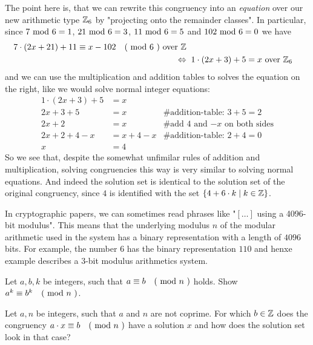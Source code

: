 \begin{example} 
The point here is, that we can rewrite this congruency into an \textit{equation} over our new arithmetic type $\mathbb{Z}_6$ by "projecting onto the remainder classes". In particular, since $7 \text{ mod } 6= 1$, $21 \text{ mod } 6= 3$, $11 \text{ mod } 6= 5$ and $102 \text{ mod } 6= 0$ we have
\begin{align*}
7\cdot(2x+21) + 11 \equiv x-102 \quad \text{( mod } 6 \text{ )} \text{ over } \mathbb{Z}\\ 
\Leftrightarrow & \; \; 1\cdot (2x+3) + 5 = x \text{ over } \mathbb{Z}_6
\end{align*}
and we can use the multiplication and addition tables to solves the equation on the right, like we would solve normal integer equations:
\begin{align*}
1\cdot (2x+3) + 5 &= x & \text{ }\\
2x+3 + 5 &= x & \text{\# addition-table: } 3+5 = 2 \\
2x+2 &= x & \text{\# add 4 and $-x$ on both sides} \\
2x+2 +4 -x &= x + 4 -x & \text{\# addition-table: } 2+4 = 0 \\
x &= 4 &
\end{align*}
So we see that, despite the somewhat unfimilar rules of addition and multiplication, solving congruencies this way is very similar to solving normal equations. And indeed the solution set is identical to the solution set of the original congruency, since $4$ is identified with the set $\{4+6\cdot k\;|\; k\in\mathbb{Z}\}$.
\end{example}

\begin{jargon} In cryptographic papers, we can sometimes read phrases like "$[\ldots]$ using a 4096-bit modulus". This means that the underlying modulus $n$ of the modular arithmetic used in the system has a binary representation with a length of $4096$ bits. For example, the number $6$ has the binary representation $110$ and henxe example describes a $3$-bit modulus arithmetics system.   
\end{jargon}
\begin{exercise}
Let $a,b,k$ be integers, such that $a \equiv b \quad \text{( mod } n \text{ )}$ holds. Show $a^k \equiv b^k \quad \text{( mod } n \text{ )}$.
\end{exercise}
\begin{exercise}
Let $a,n$ be integers, such that $a$ and $n$ are not coprime. For which $b\in\mathbb{Z}$ does the 
congruency $a\cdot x \equiv b \quad \text{( mod } n \text{ )}$ have a solution $x$ and how does the solution set look in that case?
\end{exercise}
